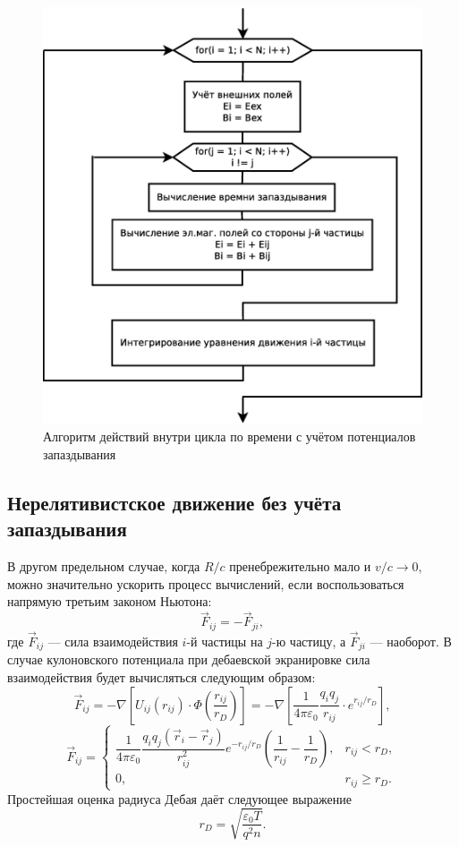 \begin{figure}[h!]
\centering
\includegraphics[width=0.7\linewidth]{./fig/ch3/Diagram3}
\caption{Алгоритм действий внутри цикла по времени с учётом потенциалов запаздывания}
\label{fig:Diagram3}
\end{figure}


\subsection{Нерелятивистское движение без учёта запаздывания}

В другом предельном случае, когда $R/c$ пренебрежительно мало и $v/c \to 0$, можно значительно ускорить процесс вычислений, если воспользоваться напрямую третьим законом Ньютона:
\begin{equation}
\vec{F}_{ij} = - \vec{F}_{ji},
\end{equation}
где $\vec{F}_{ij}$ --- сила взаимодействия $i$-й частицы на $j$-ю частицу, а $\vec{F}_{ji}$ --- наоборот.  В случае кулоновского потенциала при дебаевской экранировке сила взаимодействия будет вычисляться следующим образом:
\begin{equation*}
	\vec{F}_{ij} = - \nabla \left[U_{ij} (r_{ij}) \cdot \Phi \left( \frac{r_{ij}}{r_D} \right)\right] = - \nabla \left[ \frac{1}{4 \pi \varepsilon_0} \frac{q_i q_j}{r_{ij}} \cdot e^{r_{ij}/r_D} \right],
\end{equation*}
\begin{equation}
	\vec{F}_{ij} = 
	\begin{cases}
		\dfrac{1}{4 \pi \varepsilon_0} \dfrac{q_iq_j \left( \vec{r}_i - \vec{r}_j \right)}{r_{ij}^2} e^{-r_{ij}/r_D} \left( \dfrac{1}{r_{ij}} - \dfrac{1}{r_D} \right), & r_{ij} < r_D, \\
		0, & r_{ij} \geq r_D.
	\end{cases}
	\label{eq:force_with_debai}
\end{equation}
Простейшая оценка радиуса Дебая даёт следующее выражение
\begin{equation}
	r_D = \sqrt{\frac{\varepsilon_0 T}{q^2n}}.
	\label{eq:debai_analitic}
\end{equation}


